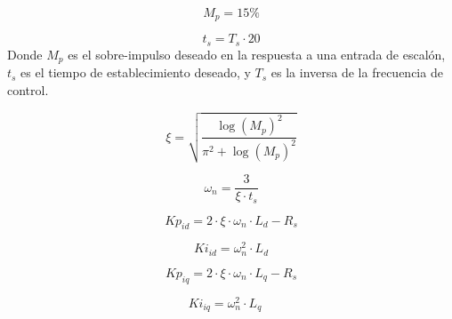 \[
M_p = 15 \%
\]

\[
 t_s = T_s \cdot 20
\]
Donde $M_p$ es el sobre-impulso deseado en la respuesta a una entrada de escalón, $t_s$ es el tiempo de establecimiento deseado, y $T_s$ es la inversa de la frecuencia de control.

\begin{equation}
	\xi = \sqrt{\frac{\log(M_p)^2}{\pi^2 + \log(M_p)^2}}
\end{equation}

\begin{equation}
\omega_n = \frac{3}{\xi \cdot t_s}
\end{equation}

\begin{equation}
Kp_{id} = 2 \cdot \xi \cdot \omega_n \cdot L_d - R_s
\end{equation}

\begin{equation}
Ki_{id} = \omega_n^2 \cdot L_d
\end{equation}

\begin{equation}
Kp_{iq} = 2 \cdot \xi \cdot \omega_n \cdot L_q - R_s
\end{equation}

\begin{equation}
Ki_{iq} = \omega_n^2 \cdot L_q \quad
\end{equation}

